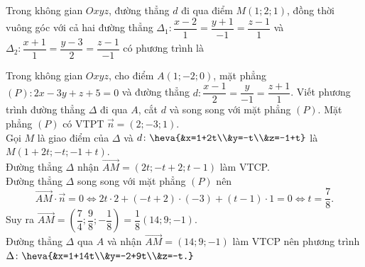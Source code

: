 \begin{bt}%

	Trong không gian $Oxyz$, đường thẳng $d$ đi qua điểm $M(1; 2; 1)$, đồng thời vuông góc với cả hai đường thẳng $\Delta_{1}\colon \dfrac{x-2}{1}=\dfrac{y+1}{-1}=\dfrac{z-1}{1}$ và $\Delta_{2}\colon \dfrac{x+1}{1}=\dfrac{y-3}{2}=\dfrac{z-1}{-1}$ có phương trình là
\end{bt}

\begin{bt}%

	Trong không gian $Oxyz$, cho điểm $A(1;-2;0)$, mặt phẳng $(P)\colon 2x-3y+z+5=0$ và đường thẳng $d\colon \dfrac{x-1}{2}=\dfrac{y}{-1}=\dfrac{z+1}{1}$. Viết phương trình đường thẳng $\Delta$ đi qua $A$, cắt $d$ và song song với mặt phẳng $(P)$.
	\loigiai
	{
		Mặt phẳng $(P)$ có VTPT $\overrightarrow{n}=(2 ;-3 ; 1)$.\\
		Gọi $M$ là giao điểm của $\Delta$ và $d\colon \heva{&x=1+2t\\&y=-t\\&z=-1+t}$ là $M(1+2t ;-t ;-1+t)$.\\
		Đường thẳng $\Delta$ nhận $\overrightarrow{AM}=(2 t ;-t+2 ; t-1)$ làm VTCP.\\
		Đường thẳng $\Delta$ song song với mặt phẳng $(P)$ nên
		$$\overrightarrow{AM} \cdot \overrightarrow{n}=0 \Leftrightarrow 2t \cdot 2+(-t+2)\cdot(-3)+(t-1) \cdot 1=0 \Leftrightarrow t=\dfrac{7}{8}.$$
		Suy ra $\overrightarrow{AM}=\left(\dfrac{7}{4} ; \dfrac{9}{8} ;-\dfrac{1}{8}\right)=\dfrac{1}{8}(14 ; 9 ;-1)$.\\
		Đường thẳng $\Delta$ qua $A$ và nhận $\overrightarrow{AM}=(14 ; 9 ;-1)$ làm VTCP nên phương trình $\Delta\colon \heva{&x=1+14t\\&y=-2+9t\\&z=-t.}$	
	}
\end{bt}

